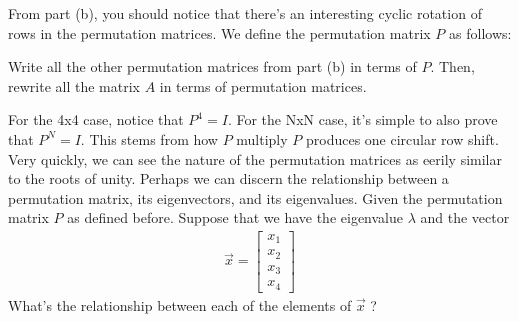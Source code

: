 \begin{enumerate}

\qitem
From part (b), you should notice that there's an interesting cyclic rotation of rows in the permutation matrices.
We define the permutation matrix $P$ as follows:

Write all the other permutation matrices from part (b) in terms of $P$.
Then, rewrite all the matrix $A$ in terms of permutation matrices.


\qitem
For the 4x4 case, notice that $P^{4} = I$.
For the NxN case, it's simple to also prove that $P^{N} = I$.
This stems from how $P$ multiply $P$ produces one circular row shift.
Very quickly, we can see the nature of the permutation matrices as eerily similar to the roots of unity.
Perhaps we can discern the relationship between a permutation matrix, its eigenvectors, and its eigenvalues.
Given the permutation matrix $P$ as defined before.
Suppose that we have the eigenvalue $\lambda$ and the vector
\begin{align*}
\vec{x} =
\begin{bmatrix}
x_{1}\\
x_{2}\\
x_{3}\\
x_{4}
\end{bmatrix}
\end{align*}
What's the relationship between each of the elements of $\vec{x}$ \hspace{0.2mm}?
\end{enumerate}


